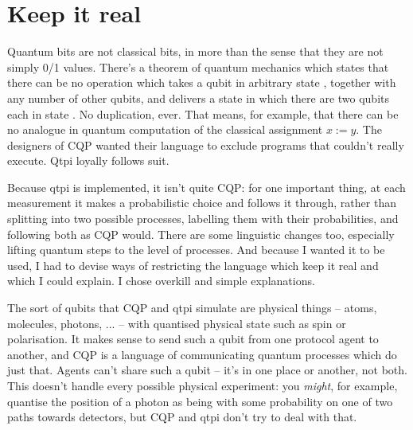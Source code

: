 \section{Keep it real}

Quantum bits are not classical bits, in more than the sense that they are not simply 0/1 values. There's a theorem of quantum mechanics which states that there can be no operation which takes a qubit in arbitrary state \bv{\phi}, together with any number of other qubits, and delivers a state in which there are two qubits each in state \bv{\phi}. No duplication, ever. That means, for example, that there can be no analogue in quantum computation of the classical assignment $x:=y$. The designers of CQP \citep{GaySJ:comqp} wanted their language to exclude programs that couldn't really execute. Qtpi loyally follows suit.

Because qtpi is implemented, it isn't quite CQP: for one important thing, at each measurement it makes a probabilistic choice and follows it through, rather than splitting into two possible processes, labelling them with their probabilities, and following both as CQP would. There are some linguistic changes too, especially lifting quantum steps to the level of processes. And because I wanted it to be used, I had to devise ways of restricting the language which keep it real and which I could explain. I chose overkill and simple explanations. 

The sort of qubits that CQP and qtpi simulate are physical things -- atoms, molecules, photons, ... -- with quantised physical state such as spin or polarisation. It makes sense to send such a qubit from one protocol agent to another, and CQP is a language of communicating quantum processes which do just that. Agents can't share such a qubit -- it's in one place or another, not both. This doesn't handle every possible physical experiment: you \emph{might}, for example,  quantise the position of a photon as being with some probability on one of two paths towards detectors, but CQP and qtpi don't try to deal with that.

